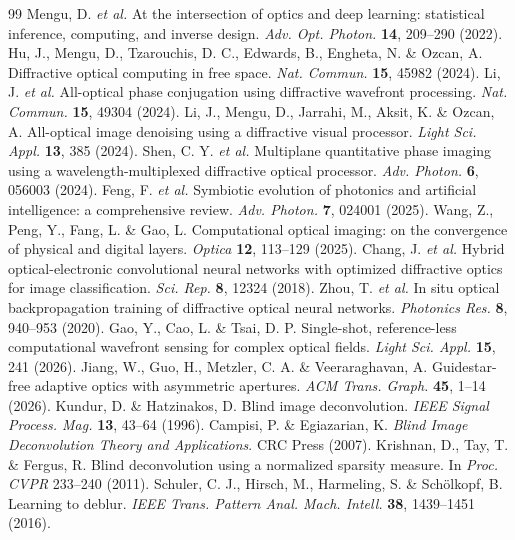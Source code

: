 \documentclass[11pt]{article}
\begin{document}
\begin{thebibliography}{99}
 Mengu, D. \textit{et al.} At the intersection of optics and deep learning: statistical inference, computing, and inverse design. \textit{Adv. Opt. Photon.} \textbf{14}, 209--290 (2022).
 Hu, J., Mengu, D., Tzarouchis, D. C., Edwards, B., Engheta, N. \& Ozcan, A. Diffractive optical computing in free space. \textit{Nat. Commun.} \textbf{15}, 45982 (2024).
 Li, J. \textit{et al.} All-optical phase conjugation using diffractive wavefront processing. \textit{Nat. Commun.} \textbf{15}, 49304 (2024).
 Li, J., Mengu, D., Jarrahi, M., Aksit, K. \& Ozcan, A. All-optical image denoising using a diffractive visual processor. \textit{Light Sci. Appl.} \textbf{13}, 385 (2024).
 Shen, C. Y. \textit{et al.} Multiplane quantitative phase imaging using a wavelength-multiplexed diffractive optical processor. \textit{Adv. Photon.} \textbf{6}, 056003 (2024).
 Feng, F. \textit{et al.} Symbiotic evolution of photonics and artificial intelligence: a comprehensive review. \textit{Adv. Photon.} \textbf{7}, 024001 (2025).
 Wang, Z., Peng, Y., Fang, L. \& Gao, L. Computational optical imaging: on the convergence of physical and digital layers. \textit{Optica} \textbf{12}, 113--129 (2025).
 Chang, J. \textit{et al.} Hybrid optical-electronic convolutional neural networks with optimized diffractive optics for image classification. \textit{Sci. Rep.} \textbf{8}, 12324 (2018).
 Zhou, T. \textit{et al.} In situ optical backpropagation training of diffractive optical neural networks. \textit{Photonics Res.} \textbf{8}, 940--953 (2020).
 Gao, Y., Cao, L. \& Tsai, D. P. Single-shot, reference-less computational wavefront sensing for complex optical fields. \textit{Light Sci. Appl.} \textbf{15}, 241 (2026).
 Jiang, W., Guo, H., Metzler, C. A. \& Veeraraghavan, A. Guidestar-free adaptive optics with asymmetric apertures. \textit{ACM Trans. Graph.} \textbf{45}, 1--14 (2026).
 Kundur, D. \& Hatzinakos, D. Blind image deconvolution. \textit{IEEE Signal Process. Mag.} \textbf{13}, 43--64 (1996).
 Campisi, P. \& Egiazarian, K. \textit{Blind Image Deconvolution Theory and Applications}. CRC Press (2007).
 Krishnan, D., Tay, T. \& Fergus, R. Blind deconvolution using a normalized sparsity measure. In \textit{Proc. CVPR} 233--240 (2011).
 Schuler, C. J., Hirsch, M., Harmeling, S. \& Sch{\"o}lkopf, B. Learning to deblur. \textit{IEEE Trans. Pattern Anal. Mach. Intell.} \textbf{38}, 1439--1451 (2016).

\end{thebibliography}
\end{document}
